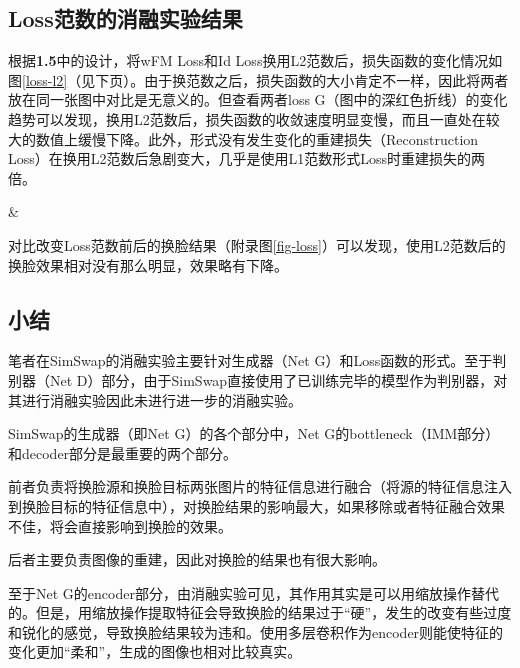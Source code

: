 \documentclass[a4paper]{article}
\begin{document}
\subsection{Loss范数的消融实验结果}

根据\textbf{1.5}中的设计，将wFM Loss和Id Loss换用L2范数后，损失函数的变化情况如图\ref{loss-l2}（见下页）。由于换范数之后，损失函数的大小肯定不一样，因此将两者放在同一张图中对比是无意义的。但查看两者loss G（图中的深红色折线）的变化趋势可以发现，换用L2范数后，损失函数的收敛速度明显变慢，而且一直处在较大的数值上缓慢下降。此外，形式没有发生变化的重建损失（Reconstruction Loss）在换用L2范数后急剧变大，几乎是使用L1范数形式Loss时重建损失的两倍。


\begin{figure*}[htb]
\centering

&
\caption{Change of Loss in Ablation Studies of Loss Norm}
\label{loss-l2}
\end{figure*}

对比改变Loss范数前后的换脸结果（附录图\ref{fig-loss}）可以发现，使用L2范数后的换脸效果相对没有那么明显，效果略有下降。

\subsection{小结}

笔者在SimSwap的消融实验主要针对生成器（Net G）和Loss函数的形式。至于判别器（Net D）部分，由于SimSwap直接使用了已训练完毕的模型作为判别器，对其进行消融实验因此未进行进一步的消融实验。

\vspace{1em}
SimSwap的生成器（即Net G）的各个部分中，Net G的bottleneck（IMM部分）和decoder部分是最重要的两个部分。

前者负责将换脸源和换脸目标两张图片的特征信息进行融合（将源的特征信息注入到换脸目标的特征信息中），对换脸结果的影响最大，如果移除或者特征融合效果不佳，将会直接影响到换脸的效果。

后者主要负责图像的重建，因此对换脸的结果也有很大影响。

至于Net G的encoder部分，由消融实验可见，其作用其实是可以用缩放操作替代的。但是，用缩放操作提取特征会导致换脸的结果过于“硬”，发生的改变有些过度和锐化的感觉，导致换脸结果较为违和。使用多层卷积作为encoder则能使特征的变化更加“柔和”，生成的图像也相对比较真实。
\end{document}
